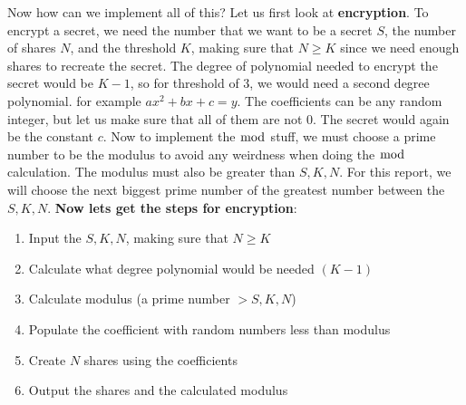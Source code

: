 \documentclass[15pt]{article}
\begin{document}
\begin{flushleft}
Now how can we implement all of this? Let us first look at \textbf{encryption}.
To encrypt a secret, we need the number that we want to be a secret $S$, the
number of shares $N$, and the threshold $K$, making sure that $N \geq K$ since
we need enough shares to recreate the secret. The degree of polynomial needed to
encrypt the secret would be $K-1$, so for threshold of $3$, we would need a
second degree polynomial. for example $ax^2 + bx + c = y$. The coefficients can
be any random integer, but let us make sure that all of them are not $0$. The
secret would again be the constant $c$. Now to implement the $\bmod$ stuff, we
must choose a prime number to be the modulus to avoid any weirdness when doing
the $\bmod$ calculation. The modulus must also be greater than $S,K,N$. For
this report, we will choose the next biggest prime number of the greatest number
between the $S,K,N$. \textbf{Now lets get the steps for encryption}:
\begin{enumerate}
    \item Input the $S,K,N$, making sure that $N \geq K$
    \item Calculate what degree polynomial would be needed $(K-1)$
    \item Calculate modulus (a prime number $> S,K,N$)
    \item Populate the coefficient with random numbers less than modulus
    \item Create $N$ shares using the coefficients
    \item Output the shares and the calculated modulus
\end{enumerate}


\end{flushleft}
\end{document}
